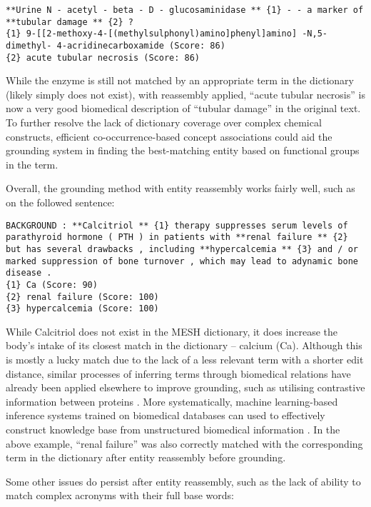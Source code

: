 \documentclass[10pt, oneside]{article}
\begin{document}
\begin{lstlisting}[breaklines]
**Urine N - acetyl - beta - D - glucosaminidase ** {1} - - a marker of **tubular damage ** {2} ? 
{1} 9-[[2-methoxy-4-[(methylsulphonyl)amino]phenyl]amino] -N,5-dimethyl- 4-acridinecarboxamide (Score: 86)
{2} acute tubular necrosis (Score: 86)
\end{lstlisting}

While the enzyme is still not matched by an appropriate term in the dictionary (likely simply does not exist), with reassembly applied, ``acute tubular necrosis'' is now a very good biomedical description of ``tubular damage'' in the original text. To further resolve the lack of dictionary coverage over complex chemical constructs, efficient co-occurrence-based concept associations \cite{tsuruoka2008facta} could aid the grounding system in finding the best-matching entity based on functional groups in the term. 

Overall, the grounding method with entity reassembly works fairly well, such as on the followed sentence:

\begin{lstlisting}[breaklines]
BACKGROUND : **Calcitriol ** {1} therapy suppresses serum levels of parathyroid hormone ( PTH ) in patients with **renal failure ** {2} but has several drawbacks , including **hypercalcemia ** {3} and / or marked suppression of bone turnover , which may lead to adynamic bone disease . 
{1} Ca (Score: 90)
{2} renal failure (Score: 100)
{3} hypercalcemia (Score: 100)
\end{lstlisting}

While Calcitriol does not exist in the MESH dictionary, it does increase the body's intake of its closest match in the dictionary -- calcium (Ca). Although this is mostly a lucky match due to the lack of a less relevant term with a shorter edit distance, similar processes of inferring terms through biomedical relations have already been applied elsewhere to improve grounding, such as utilising contrastive information between proteins \cite{kim2005biocontrasts}. More systematically, machine learning-based inference systems trained on biomedical databases can used to effectively construct knowledge base from unstructured biomedical information \cite{shin2015incremental}. In the above example, ``renal failure'' was also correctly matched with the corresponding term in the dictionary after entity reassembly before grounding.

Some other issues do persist after entity reassembly, such as the lack of ability to match complex acronyms with their full base words:
\end{document}
